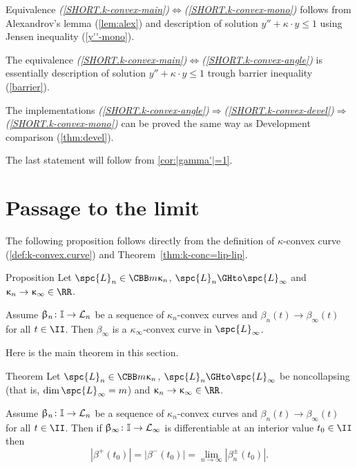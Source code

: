  Equivalence {\it (\ref{SHORT.k-convex-main})$\Leftrightarrow$(\ref{SHORT.k-convex-mono})} follows from Alexandrov's lemma (\ref{lem:alex}) and description of solution $y''+\kappa\cdot  y\le 1$ using Jensen inequality (\ref{y''-mono}).

The equivalence {\it(\ref{SHORT.k-convex-main})$\Leftrightarrow$(\ref{SHORT.k-convex-angle})} is essentially description of solution $y''+\kappa\cdot  y\le 1$ trough barrier inequality (\ref{barrier}).

The implementations {\it(\ref{SHORT.k-convex-angle})$\Rightarrow$(\ref{SHORT.k-convex-devel})$\Rightarrow$(\ref{SHORT.k-convex-mono})} can be proved the same way as Development comparison (\ref{thm:devel}).

The last statement will follow from \ref{cor:|gamma'|=1}.%
\qeds













\section{Passage to the limit}

The following proposition follows directly from the definition of $\kappa$-convex curve (\ref{def:k-convex.curve}) and Theorem~\ref{thm:k-conc=lip-lip}.

\begin{thm}{Proposition}\label{prop:lim-length}
Let 
$\spc{L}_n\in\CBB m{\kappa_n}$, 
$\spc{L}_n\GHto \spc{L}_\infty$
and $\kappa_n\to\kappa_\infty\in\RR$.

Assume $\beta_n\:\II\to \spc{L}_n$ be a sequence of $\kappa_n$-convex curves
and $\beta_n(t)\to \beta_\infty(t)$ for all $t\in\II$.
Then $\beta_\infty$ is a $\kappa_\infty$-convex curve in $\spc{L}_\infty$.
\end{thm}


Here is the main theorem in this section.

\begin{thm}{Theorem}\label{thm:lim-length}
Let 
$\spc{L}_n\in\CBB m{\kappa_n}$, 
$\spc{L}_n\GHto \spc{L}_\infty$ be noncollapsing (that is, $\dim\spc{L}_\infty=m$)
and $\kappa_n\to\kappa_\infty\in\RR$.

Assume $\beta_n\:\II\to \spc{L}_n$ be a sequence of $\kappa_n$-convex curves
and $\beta_n(t)\to \beta_\infty(t)$ for all $t\in\II$.
Then if $\beta_\infty\:\II\to\spc{L}_\infty$ is differentiable at an interior value $t_0\in\II$
then 
\[|\beta^+(t_0)|=|\beta^-(t_0)|=\lim_{n\to\infty} |\beta_n^\pm(t_0)|.\]

\end{thm}


